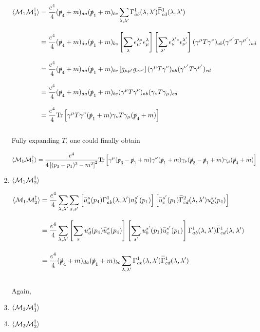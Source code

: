 \begin{solution}
\begin{enumerate}[label=(\alph*)]
    \begin{align*}
        \expval{\mathcal{M}_1\mathcal{M}_1^\dagger} &= \frac{e^4}{4}  (\pslash_4+m)_{da}  (\pslash_1+m)_{bc}  \sum_{\lambda,\lambda'} \Gamma^1_{ab}(\lambda,\lambda') \overbar{\Gamma}^1_{cd}(\lambda,\lambda') \\[0.12in]
        &= \frac{e^4}{4}  (\pslash_4+m)_{da}  (\pslash_1+m)_{bc} \left[ \sum_{\lambda}  \epsilon^{\lambda\ast}_{\mu'} \epsilon^\lambda_\mu \right] \left[ \sum_{\lambda'}  \epsilon^{\lambda' \ast}_\nu \epsilon^{\lambda'}_{\nu'} \right]  (\gamma^\mu T \gamma^\nu)_{ab} (\gamma^{\nu'} T \gamma^{\mu'})_{cd} \\[0.12in]
        &= \frac{e^4}{4}  (\pslash_4+m)_{da}  (\pslash_1+m)_{bc} \left[ g_{\mu\mu'} g_{\nu\nu'} \right](\gamma^\mu T \gamma^\nu)_{ab} (\gamma^{\nu'} T \gamma^{\mu'})_{cd}  \\[0.12in]
        &= \frac{e^4}{4}  (\pslash_4+m)_{da}  (\pslash_1+m)_{bc} (\gamma^\mu T \gamma^\nu)_{ab} (\gamma_{\nu} T \gamma_{\mu})_{cd}  \\[0.12in]
        &= \frac{e^4}{4} \tr \left[ \gamma^\mu T \gamma^\nu (\pslash_1+m) \gamma_{\nu} T \gamma_{\mu} (\pslash_4+m )\right] 
    \end{align*}\\
    Fully expanding $T$, one could finally obtain 

    \begin{align}
        \langle \mathcal{M}_1\mathcal{M}_1^\dagger \rangle = \frac{e^4}{4\left[(p_3-p_1)^2-m^2\right]^2} \text{Tr} \left[ \gamma^\mu (\slashed{p}_3-\slashed{p}_1 +m) \gamma^\nu (\slashed{p}_1 + m ) \gamma_\nu  (\slashed{p}_3-\slashed{p}_1 +m) \gamma_\mu (\slashed{p}_4 + m ) \right]
    \end{align}
    \item $\langle \mathcal{M}_1\mathcal{M}_2^\dagger \rangle $
    
    \begin{align}
        \expval{\mathcal{M}_1\mathcal{M}_2^\dagger} &= \frac{e^4}{4}  \sum_{\lambda,\lambda'} \sum_{s,s'} \left[  \overbar{u}^s_a(p_4) \Gamma^1_{ab}(\lambda,\lambda')u^{s'}_b(p_1)\right] \left[  \overbar{u}^{s'}_c(p_1)\overbar{\Gamma}^2_{cd}(\lambda,\lambda')u^s_d(p_4)\right] \nonumber \\[0.12in]
        &=  \frac{e^4}{4} \sum_{\lambda,\lambda'} \left[ \sum_{s} u^s_d(p_4) \overbar{u}^s_a(p_4) \right]  \left[ \sum_{s'}u^{s'}_b(p_1)   \overbar{u}^{s'}_c(p_1) \right] \Gamma^1_{ab}(\lambda,\lambda') \overbar{\Gamma}^1_{cd}(\lambda,\lambda') \nonumber \\[0.15in]
        &= \frac{e^4}{4}  (\pslash_4+m)_{da}  (\pslash_1+m)_{bc}  \sum_{\lambda,\lambda'} \Gamma^1_{ab}(\lambda,\lambda') \overbar{\Gamma}^1_{cd}(\lambda,\lambda')  
    \end{align}\\
    Again,
    \item $\langle \mathcal{M}_2\mathcal{M}_1^\dagger \rangle $
    \item $\langle \mathcal{M}_2\mathcal{M}_2^\dagger \rangle $
    

\end{enumerate}
\end{solution}
